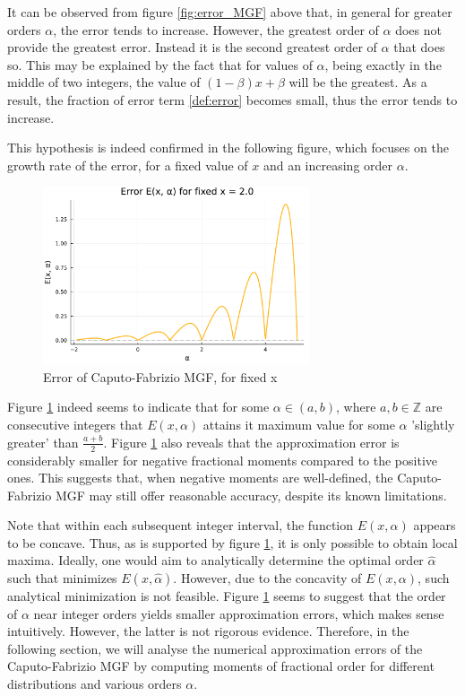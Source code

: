 It can be observed from figure \ref{fig:error_MGF} above that, in general for greater orders \(\alpha\), the error tends to increase. However, the greatest order of \(\alpha\) does not provide the greatest error. Instead it is the second greatest order of \(\alpha\) that does so. This may be explained by the fact that for values of \(\alpha\), being exactly in the middle of two integers, the value of \((1 - \beta)x + \beta\) will be the greatest. As a result, the fraction of error term \ref{def:error} becomes small, thus the error tends to increase.

This hypothesis is indeed confirmed in the following figure, which focuses on the growth rate of the error, for a fixed value of \(x\) and an increasing order \(\alpha\).

\begin{figure}[H]
    \centering
    \includegraphics[width=0.7\textwidth]{figures/error_plot_fixed_x.pdf}
    \caption{Error of Caputo-Fabrizio MGF, for fixed x}
    \label{fig:error_MGF_fixed_x}
\end{figure}
Figure \ref{fig:error_MGF_fixed_x} indeed seems to indicate that for some \(\alpha \in (a, b)\), where \(a, b \in \mathbb{Z}\) are consecutive integers that \(E(x, \alpha)\) attains it maximum value for some \(\alpha\) 'slightly greater' than \(\frac{a + b}{2}\). Figure \ref{fig:error_MGF_fixed_x} also reveals that the approximation error is considerably smaller for negative fractional moments compared to the positive ones. This suggests that, when negative moments are well-defined, the Caputo-Fabrizio MGF may still offer reasonable accuracy, despite its known limitations.

Note that within each subsequent integer interval, the function \(E(x, \alpha)\) appears to be concave. Thus, as is supported by figure \ref{fig:error_MGF_fixed_x}, it is only possible to obtain local maxima. Ideally, one would aim to analytically determine the optimal order \(\hat{\alpha}\) such that minimizes \(E(x, \hat{\alpha})\). However, due to the concavity of \(E(x, \alpha)\), such analytical minimization is not feasible. Figure \ref{fig:error_MGF_fixed_x} seems to suggest that the order of \(\alpha\) near integer orders yields smaller approximation errors, which makes sense intuitively. However, the latter is not rigorous evidence. Therefore, in the following section, we will analyse the numerical approximation errors of the Caputo-Fabrizio MGF by computing moments of fractional order for different distributions and various orders \(\alpha\).

